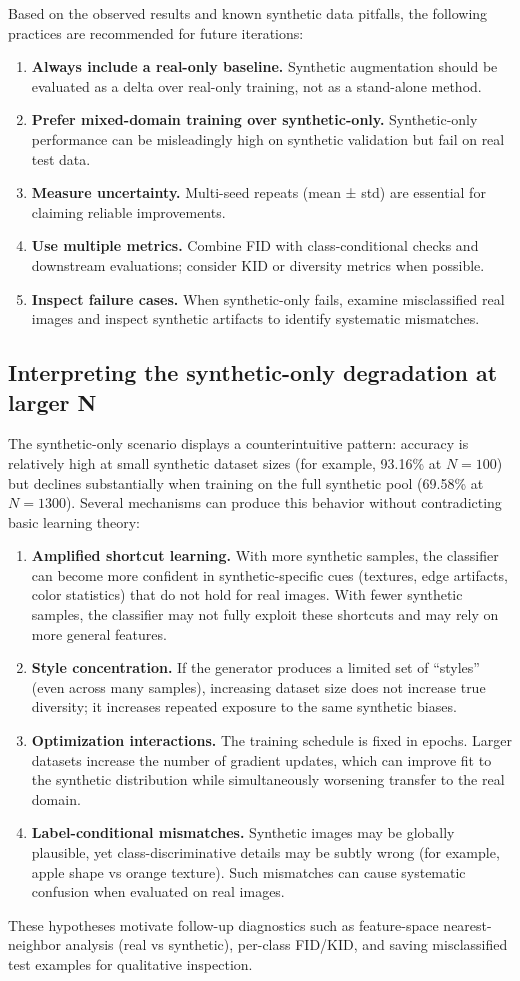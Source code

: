 Based on the observed results and known synthetic data pitfalls, the following practices are recommended for future iterations:
\begin{enumerate}
\item \textbf{Always include a real-only baseline.} Synthetic augmentation should be evaluated as a delta over real-only training, not as a stand-alone method.
\item \textbf{Prefer mixed-domain training over synthetic-only.} Synthetic-only performance can be misleadingly high on synthetic validation but fail on real test data.
\item \textbf{Measure uncertainty.} Multi-seed repeats (mean ± std) are essential for claiming reliable improvements.
\item \textbf{Use multiple metrics.} Combine FID with class-conditional checks and downstream evaluations; consider KID or diversity metrics when possible.
\item \textbf{Inspect failure cases.} When synthetic-only fails, examine misclassified real images and inspect synthetic artifacts to identify systematic mismatches.
\end{enumerate}

\subsection{Interpreting the synthetic-only degradation at larger N}

The synthetic-only scenario displays a counterintuitive pattern: accuracy is relatively high at small synthetic dataset sizes (for example, 93.16\% at \(N=100\)) but declines substantially when training on the full synthetic pool (69.58\% at \(N=1300\)). Several mechanisms can produce this behavior without contradicting basic learning theory:
\begin{enumerate}
\item \textbf{Amplified shortcut learning.} With more synthetic samples, the classifier can become more confident in synthetic-specific cues (textures, edge artifacts, color statistics) that do not hold for real images. With fewer synthetic samples, the classifier may not fully exploit these shortcuts and may rely on more general features.
\item \textbf{Style concentration.} If the generator produces a limited set of ``styles'' (even across many samples), increasing dataset size does not increase true diversity; it increases repeated exposure to the same synthetic biases.
\item \textbf{Optimization interactions.} The training schedule is fixed in epochs. Larger datasets increase the number of gradient updates, which can improve fit to the synthetic distribution while simultaneously worsening transfer to the real domain.
\item \textbf{Label-conditional mismatches.} Synthetic images may be globally plausible, yet class-discriminative details may be subtly wrong (for example, apple shape vs orange texture). Such mismatches can cause systematic confusion when evaluated on real images.
\end{enumerate}

These hypotheses motivate follow-up diagnostics such as feature-space nearest-neighbor analysis (real vs synthetic), per-class FID/KID, and saving misclassified test examples for qualitative inspection.
